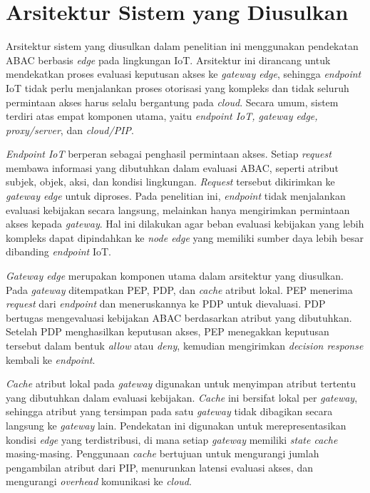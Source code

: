 \section{Arsitektur Sistem yang Diusulkan}

Arsitektur sistem yang diusulkan dalam penelitian ini menggunakan pendekatan ABAC berbasis \textit{edge} pada lingkungan IoT. Arsitektur ini dirancang untuk mendekatkan proses evaluasi keputusan akses ke \textit{gateway edge}, sehingga \textit{endpoint} IoT tidak perlu menjalankan proses otorisasi yang kompleks dan tidak seluruh permintaan akses harus selalu bergantung pada \textit{cloud}. Secara umum, sistem terdiri atas empat komponen utama, yaitu \textit{endpoint IoT, gateway edge, proxy/server}, dan \textit{cloud/PIP}.

\textit{Endpoint IoT} berperan sebagai penghasil permintaan akses. Setiap \textit{request} membawa informasi yang dibutuhkan dalam evaluasi ABAC, seperti atribut subjek, objek, aksi, dan kondisi lingkungan. \textit{Request} tersebut dikirimkan ke \textit{gateway edge} untuk diproses. Pada penelitian ini, \textit{endpoint} tidak menjalankan evaluasi kebijakan secara langsung, melainkan hanya mengirimkan permintaan akses kepada \textit{gateway}. Hal ini dilakukan agar beban evaluasi kebijakan yang lebih kompleks dapat dipindahkan ke \textit{node edge} yang memiliki sumber daya lebih besar dibanding \textit{endpoint} IoT.

\textit{Gateway edge} merupakan komponen utama dalam arsitektur yang diusulkan. Pada \textit{gateway} ditempatkan PEP, PDP, dan \textit{cache} atribut lokal. PEP menerima \textit{request} dari \textit{endpoint} dan meneruskannya ke PDP untuk dievaluasi. PDP bertugas mengevaluasi kebijakan ABAC berdasarkan atribut yang dibutuhkan. Setelah PDP menghasilkan keputusan akses, PEP menegakkan keputusan tersebut dalam bentuk \textit{allow} atau \textit{deny}, kemudian mengirimkan \textit{decision response} kembali ke \textit{endpoint}.

\textit{Cache} atribut lokal pada \textit{gateway} digunakan untuk menyimpan atribut tertentu yang dibutuhkan dalam evaluasi kebijakan. \textit{Cache} ini bersifat lokal per \textit{gateway}, sehingga atribut yang tersimpan pada satu \textit{gateway} tidak dibagikan secara langsung ke \textit{gateway} lain. Pendekatan ini digunakan untuk merepresentasikan kondisi \textit{edge} yang terdistribusi, di mana setiap \textit{gateway} memiliki \textit{state cache} masing-masing. Penggunaan \textit{cache} bertujuan untuk mengurangi jumlah pengambilan atribut dari PIP, menurunkan latensi evaluasi akses, dan mengurangi \textit{overhead} komunikasi ke \textit{cloud}.

